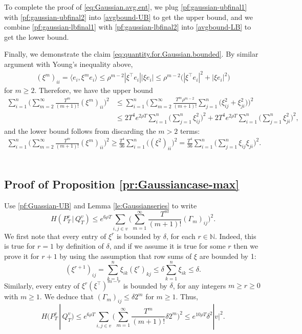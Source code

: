 \documentclass[11pt,reqno]{amsart}
\numberwithin{equation}{section}
\theoremstyle{definition}
\def\BB{{\Gamma}}
\def\N{{\mathbb N}}
\begin{document}
To complete the proof of \eqref{eq:Gaussian.avg.ent}, we plug \eqref{pf:gaussian-ubfinal1} with \eqref{pf:gaussian-ubfinal2} into \eqref{avgbound-UB} to get the upper bound, and we combine \eqref{pf:gaussian-lbfinal1} with \eqref{pf:gaussian-lbfinal2} into \eqref{avgbound-LB} to get the lower bound. 

Finally, we demonstrate the claim \eqref{eq:quantity.for.Gaussian.bounded}. By similar argument with Young's inequality above,
\begin{align*}
	 (\xi^m)_{ii} = \langle e_i, \xi^m e_i\rangle \le \rho^{m-2}|\xi^\top e_i||\xi e_i | 
	 \le \rho^{m-2}\big(|\xi^\top e_i|^2 + |\xi e_i |^2\big) 
\end{align*}
for $m\ge 2$. Therefore, we have the upper bound
\begin{align*}
	\sum_{i=1}^n \bigg(\sum_{m=2}^{\infty} \frac{T^m}{(m+1)!} (\xi^m)_{ii} \bigg)^2
	&\le \sum_{i=1}^n \bigg(\sum_{m=2}^{\infty} \frac{T^m\rho^{m-2}}{(m+1)!} \sum_{j=1}^n\Big( \xi_{ij}^2+\xi_{ji}^2\Big)  \bigg)^2 \\
	&\le 2T^4 e^{2\rho T} \sum_{i=1}^n \bigg(\sum_{j=1}^n \xi_{ij}^2 \bigg)^2 + 2T^4 e^{2\rho T}\sum_{i=1}^n \bigg(\sum_{j=1}^n \xi_{ji}^2 \bigg)^2,
\end{align*}
and the lower bound follows from discarding the $m>2$ terms:
\begin{align*}
	\sum_{i=1}^n \bigg(\sum_{m=2}^{\infty} \frac{T^m}{(m+1)!} (\xi^m)_{ii} \bigg)^2
	\ge \frac{T^4}{36} \sum_{i=1}^n \big( (\xi^2)_{ii} \big)^2
	= \frac{T^4}{36} \sum_{i=1}^n \bigg(\sum_{j=1}^n \xi_{ij}\xi_{ji} \bigg)^2.  
\end{align*}
{ \ } $\quad$ \vskip-1.2cm \hfill\qedsymbol




\subsection{Proof of Proposition \ref{pr:Gaussiancase-max}}

 Use \eqref{pf:Guassian-UB} and Lemma \ref{le:Gaussianseries} to write
\begin{equation*}
H(P^v_T\,|\,Q^v_T) \le  e^{6\rho T}   \sum_{i,j \in v} \bigg(\sum_{m=1}^{\infty} \frac{T^m}{(m+1)!} (\BB_m)_{ij}\bigg)^2.
\end{equation*}
We first note that every entry of $\xi^r$ is bounded by $\delta$, for each $r \in \N$.
Indeed, this is true for $r=1$ by definition of $\delta$, and if we assume it is true for some $r$ then we prove it for $r+1$ by using  the assumption that row sums of $\xi$ are bounded by 1:
\begin{equation*}
(\xi^{r+1})_{ij} = \sum_{k=1}^n \xi_{ik}(\xi^r)_{kj} \le \delta\sum_{k=1}^n \xi_{ik} \le \delta.
\end{equation*}
Similarly, every entry of $\xi^r(\xi^\top)^{m-r}$ is bounded by $\delta$, for any integers $m \ge r \ge 0$ with $m \ge 1$. We deduce that $(\BB_m)_{ij} \le \delta 2^m$ for $m \ge 1$.
Thus,
\begin{equation*}
H(P^v_T\,|\,Q^v_T) \le  e^{6 \rho T}   \sum_{i,j \in v} \bigg(\sum_{m=1}^{\infty} \frac{T^m}{(m+1)!} \delta 2^m \bigg)^2 \le e^{10 \rho  T}  \delta^2|v|^2.
\end{equation*}
{ \ } $\quad$ \vskip-1.2cm \hfill\qedsymbol
\end{document}
